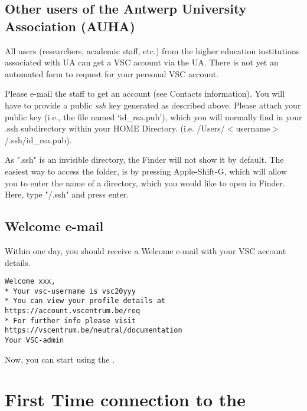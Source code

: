 \subsection{Other users of the Antwerp University Association (AUHA)}
\label{sec:other-users-of-antwerp-university}

All users (researchers, academic staff, etc.) from the higher education
institutions associated with UA can get a VSC account via the UA. There is not
yet an automated form to request for your personal VSC account.

Please e-mail the \hpc staff to get an account (see Contacts information).
You will have to provide a public \emph{ssh} key generated as described
above. Please attach your public key (i.e., the file named `id\_rsa.pub'),
which you will normally find in your .ssh subdirectory within your HOME
Directory. (i.e. /Users/$<$username$>$/.ssh/id\_rsa.pub).


\ifmac

   As ".ssh" is an invisible directory, the Finder will
  not show it by default. The easiest way to access the folder, is by pressing
  Apple-Shift-G, which will allow you to enter the name of a directory, which
  you would like to open in Finder. Here, type "\tilde/.ssh" and press enter.

\fi
\fi

\subsection{Welcome e-mail}
\label{sec:welcome-email}

Within one day, you should receive a Welcome e-mail with your VSC account details.

\begin{verbatim}
Welcome xxx,
* Your vsc-username is vsc20yyy
* You can view your profile details at https://account.vscentrum.be/req
* For further info please visit https://vscentrum.be/neutral/documentation
Your VSC-admin
\end{verbatim}

Now, you can start using the \hpc.

\section{First Time connection to the \hpc}
\label{sec:first-time-connection-to-the-hpc}

\ifwindows

